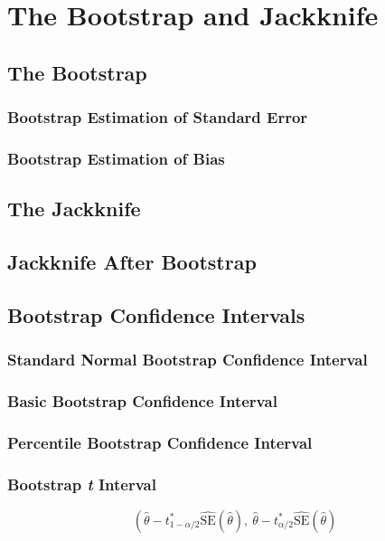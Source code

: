 \documentclass[captions=tableheading]{scrbook}
\begin{document}
\chapter{The Bootstrap and Jackknife}
\label{sec-5}
\section{The Bootstrap}
\label{sec-5_1}
\subsection{Bootstrap Estimation of Standard Error}
\label{sec-5_1_1}
\subsection{Bootstrap Estimation of Bias}
\label{sec-5_1_2}
\section{The Jackknife}
\label{sec-5_2}
\section{Jackknife After Bootstrap}
\label{sec-5_3}
\section{Bootstrap Confidence Intervals}
\label{sec-5_4}
\subsection{Standard Normal Bootstrap Confidence Interval}
\label{sec-5_4_1}
\subsection{Basic Bootstrap Confidence Interval}
\label{sec-5_4_2}
\subsection{Percentile Bootstrap Confidence Interval}
\label{sec-5_4_3}
\subsection{Bootstrap \emph{t} Interval}
\label{sec-5_4_4}

\[
\left( \hat{\theta} - t_{1 - \alpha/2}^{\ast}\widehat{\mathrm{SE}}(\hat{\theta}),\  \hat{\theta} - t_{\alpha/2}^{\ast}\widehat{\mathrm{SE}}(\hat{\theta})
\]
\end{document}
